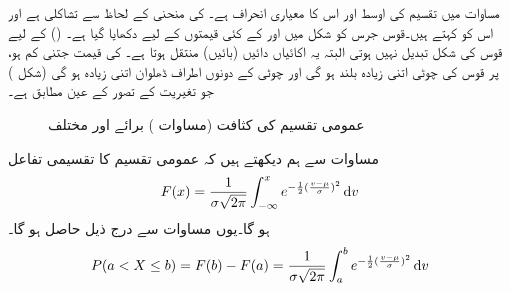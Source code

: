 مساوات  میں تقسیم کی اوسط   اور اس کا معیاری انحراف   ہے۔  کی منحنی  کے لحاظ سے تشاکلی ہے اور اس  کو  کہتے ہیں۔قوس جرس کو شکل  میں  اور  کے کئی قیمتوں کے لیے دکھایا گیا ہے۔  () کے لیے قوس کی شکل تبدیل نہیں ہوتی البتہ یہ  اکائیاں دائیں (بائیں) منتقل ہوتا ہے۔ کی قیمت جتنی کم ہو، پر قوس کی چوٹی اتنی زیادہ بلند ہو گی اور چوٹی کے دونوں اطراف ڈھلوان اتنی زیادہ ہو گی (شکل ) جو تغیریت کے تصور کے عین مطابق ہے۔
\begin{figure}
\centering
{}
\caption{عمومی تقسیم  کی کثافت (مساوات ) برائے  اور مختلف }
\label{شکل_شماریات_عمومی_تقسیم}
\end{figure}

مساوات  سے ہم دیکھتے ہیں کہ عمومی تقسیم کا تقسیمی تفاعل
\begin{align}\label{مساوات_شماریات_عمومی_تقسیم_ب}
F(x)=\frac{1}{\sigma\sqrt{2\pi}}\int_{-\infty}^{x}e^{-\frac{1}{2}(\frac{v-\mu}{\sigma})^2}\dif v
\end{align}
ہو گا۔یوں مساوات  سے درج ذیل حاصل ہو گا۔
\begin{align}\label{مساوات_شماریات_عمومی_تقسیم_پ}
P(a<X\le b)=F(b)-F(a)=\frac{1}{\sigma\sqrt{2\pi}}\int_{a}^{b}e^{-\frac{1}{2}(\frac{v-\mu}{\sigma})^2}\dif v
\end{align}

